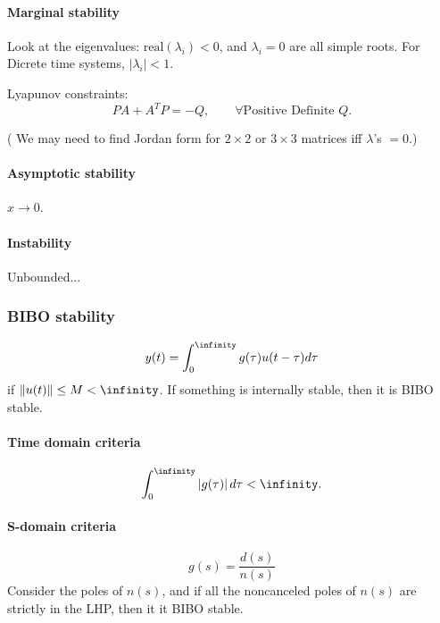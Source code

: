 \documentclass[10pt]{article}
\begin{document}
\paragraph{Marginal stability}
Look at the eigenvalues:
$\text{real}(\lambda_i) < 0$, and $\lambda_i = 0$ are all simple
roots. 
For Dicrete time systems, $\left|\lambda_i\right| < 1$. 

Lyapunov constraints:
\begin{equation*}
  PA + A^TP = -Q, \qquad \forall \text{Positive Definite } Q. 
\end{equation*}

( We may need to find Jordan form for $2\times 2$ or $3\times 3$
matrices iff $\lambda$'s $= 0$.)
\paragraph{Asymptotic stability}
$x\rightarrow 0$.


\paragraph{Instability}
Unbounded...

\subsubsection{BIBO stability}
\begin{equation*}
  y(t) = \int_0^\infinity g(\tau) u(t - \tau) d\tau 
\end{equation*}
if $\left\Vert u(t)\right\Vert \le M<\infinity$.
If something is internally stable, then it is BIBO stable.
\paragraph{Time domain criteria}
\begin{equation*}
  \int_0^\infinity \left|g(\tau)\right|d\tau < \infinity.
\end{equation*}

\paragraph{S-domain criteria}
\begin{equation*}
  g(s) = \frac{d(s)}{n(s)}
\end{equation*}
Consider the poles of $n(s)$, and if all the noncanceled poles of
$n(s)$ are strictly in the LHP, then it it BIBO stable.
\end{document}
